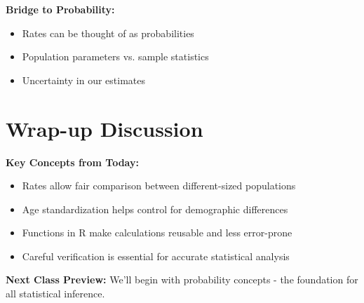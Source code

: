 \documentclass[11pt]{article}
\begin{document}
\textbf{Bridge to Probability:}
\begin{itemize}
\item Rates can be thought of as probabilities
\item Population parameters vs. sample statistics
\item Uncertainty in our estimates
\end{itemize}

\section{Wrap-up Discussion}

\textbf{Key Concepts from Today:}
\begin{itemize}
\item Rates allow fair comparison between different-sized populations
\item Age standardization helps control for demographic differences
\item Functions in R make calculations reusable and less error-prone
\item Careful verification is essential for accurate statistical analysis
\end{itemize}

\textbf{Next Class Preview:} We'll begin with probability concepts - the foundation for all statistical inference.
\end{document}
